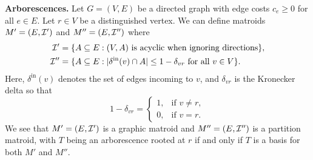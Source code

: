 {\bf Arborescences.} Let $G = (V, E)$ be a directed graph with edge costs 
$c_e \geq 0$ for all $e \in E$. Let $r \in V$ be a distinguished vertex. 
We can define matroids $M' = (E, {\cal I}')$ 
and $M'' = (E, {\cal I}'')$ where 
\begin{align*}
    {\cal I}' &= \{A \subseteq E : (V, A) \text{ is acyclic when ignoring directions}\}, \\ 
    {\cal I}'' &= \{A \subseteq E : |\delta^{\text{in}}(v) \cap A| \leq 1 - \delta_{vr} \text{ for all } v \in V\}.
\end{align*}
Here, $\delta^{\text{in}}(v)$ denotes the set of edges incoming to $v$, 
and $\delta_{vr}$ is the Kronecker delta so that 
\[ 1 - \delta_{vr} = \begin{cases}
    1, & \text{if } v \neq r, \\ 
    0, & \text{if } v = r.
\end{cases} \] 
We see that $M' = (E, {\cal I}')$ is a graphic matroid and $M'' = 
(E, {\cal I}'')$ is a partition matroid, with $T$ being an arborescence 
rooted at $r$ if and only if $T$ is a basis for both $M'$ and $M''$. 